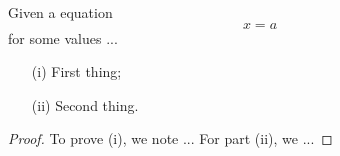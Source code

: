 \begin{theorem}
	\label{th:example}
	Given a equation
	\begin{equation}
		\label{eq:th1}
		x = a
	\end{equation}
	for some values ...
	\begin{itemize}
		\item[(i)] First thing;
		\item[(ii)] Second thing.
	\end{itemize}
\end{theorem}
\begin{proof}
	To prove (i), we note ...
	For part (ii), we ...
\end{proof}
